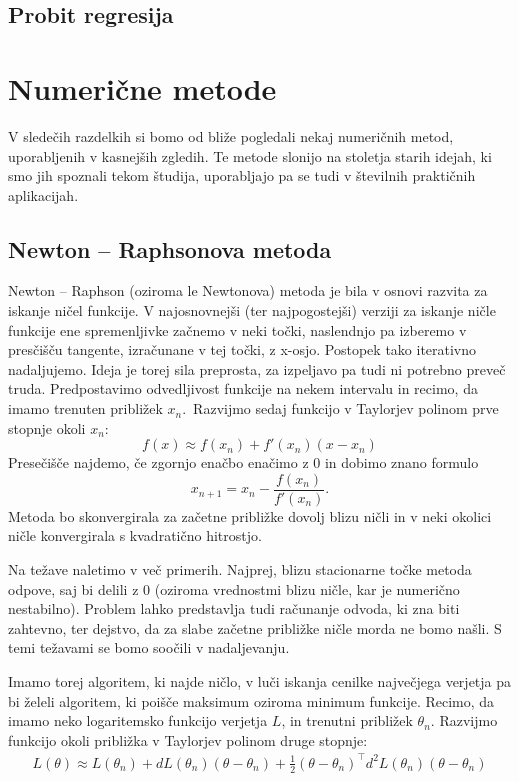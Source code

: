 \documentclass[12pt,a4paper]{amsart}
\theoremstyle{definition} %
\theoremstyle{plain} %
\begin{document}
\subsection{Probit regresija}

\section{Numerične metode}
V sledečih razdelkih si bomo od bliže pogledali nekaj numeričnih metod, uporabljenih v kasnejših zgledih. Te metode slonijo na stoletja starih
idejah, ki smo jih spoznali tekom študija, uporabljajo pa se tudi v številnih praktičnih aplikacijah.

\subsection{Newton -- Raphsonova metoda} \label{nr}
Newton -- Raphson (oziroma le Newtonova) metoda je bila v osnovi razvita za iskanje ničel funkcije. V najosnovnejši (ter najpogostejši) verziji za iskanje
ničle funkcije ene spremenljivke začnemo v neki točki, naslendnjo pa izberemo v presčišču tangente, izračunane v 
tej točki, z x-osjo. Postopek tako iterativno nadaljujemo. Ideja je torej sila preprosta, za izpeljavo pa tudi ni potrebno preveč truda.
Predpostavimo odvedljivost funkcije na nekem intervalu in recimo, da imamo trenuten približek $x_{n}.$~Razvijmo sedaj funkcijo v Taylorjev
polinom prve stopnje okoli $x_{n}:$
\[
    f(x) \approx f(x_{n}) + f'(x_{n})(x - x_{n})
\]
Presečišče najdemo, če zgornjo enačbo enačimo z 0 in dobimo znano formulo
\[
    x_{n+1} = x_{n} - \frac{f(x_{n})}{f'(x_{n})}.
\]
Metoda bo skonvergirala za začetne približke dovolj blizu ničli in v neki okolici ničle konvergirala s kvadratično hitrostjo. 

Na težave naletimo v več primerih. Najprej, blizu stacionarne točke metoda odpove, saj bi delili z 0 (oziroma vrednostmi blizu ničle, kar je numerično nestabilno).
Problem lahko predstavlja tudi računanje odvoda, ki zna biti zahtevno, ter dejstvo, da za slabe začetne približke ničle morda ne bomo našli. S temi 
težavami se bomo soočili v nadaljevanju.

Imamo torej algoritem, ki najde ničlo, v luči iskanja cenilke največjega verjetja pa bi želeli algoritem, ki poišče maksimum oziroma minimum funkcije.
Recimo, da imamo neko logaritemsko funkcijo verjetja $L$, in trenutni približek $\theta_{n}$. Razvijmo funkcijo okoli približka v Taylorjev polinom
druge stopnje:
\begin{align}
    L(\theta) \approx L(\theta_{n}) + dL(\theta_{n})(\theta - \theta_{n}) + \frac{1}{2}(\theta - \theta_{n})^\top d^{2}L(\theta_{n})(\theta - \theta_{n}) \label{taylor}   
\end{align}
\end{document}
